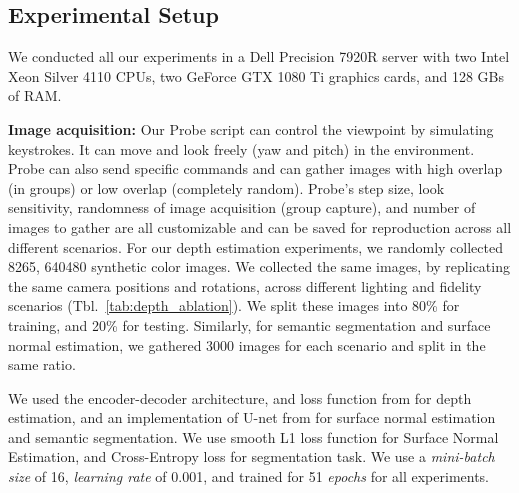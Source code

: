 \documentclass[runningheads]{llncs}
\begin{document}
\subsection{Experimental Setup}


 We conducted all our experiments in a Dell Precision 7920R server with two Intel Xeon Silver 4110 CPUs, two GeForce GTX 1080 Ti graphics cards, and 128 GBs of RAM.
\vspace{0.4em}

\noindent\textbf{Image acquisition:} Our Probe script can control the viewpoint by simulating keystrokes. It can move and look freely (yaw and pitch) in the environment. Probe can also send specific commands and can gather images with high overlap (in groups) or low overlap (completely random). Probe's step size, look sensitivity, randomness of image acquisition (group capture), and number of images to gather are all customizable and can be saved for reproduction across all different scenarios. For our depth estimation experiments, we randomly collected 8265, 640480 synthetic color images. We collected the same images, by replicating the same camera positions and rotations, across different lighting and fidelity scenarios (Tbl.~\ref{tab:depth_ablation}). We split these images into 80\% for training, and 20\% for testing. Similarly, for semantic segmentation and surface normal estimation, we gathered 3000 images for each scenario and split in the same ratio.
\vspace{0.4em}







 We used the encoder-decoder architecture, and loss function from \cite{Silberman:ECCV12} for depth estimation, and an implementation of U-net \cite{Ronneberger2015UNetCN} from \cite{DBLP:journals/corr/abs-1903-07803_deepdyn} for surface normal estimation and semantic segmentation. We use smooth L1 loss function for Surface Normal Estimation, and Cross-Entropy loss for segmentation task. We use a \textit{mini-batch size} of 16, \textit{learning rate} of  0.001, and trained for 51 \textit{epochs} for all experiments. 
\end{document}
